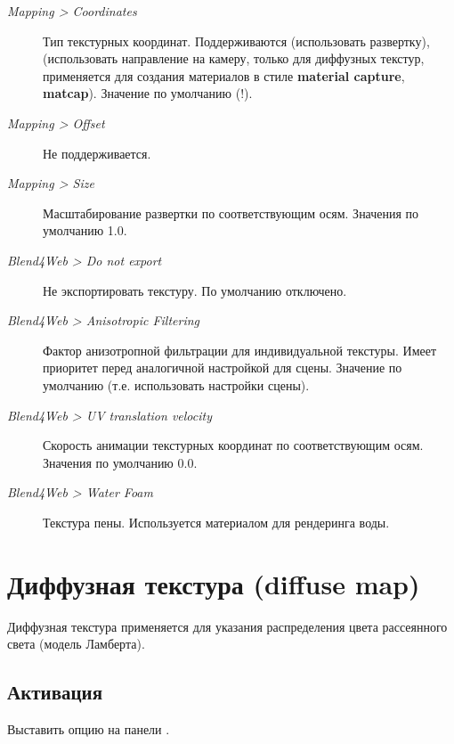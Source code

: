 \documentclass[a4paper,12pt,oneside]{sphinxmanual}
\begin{document}
\begin{description}
\item[{\emph{Mapping \textgreater{} Coordinates}}] \leavevmode
Тип текстурных координат. Поддерживаются  (использовать развертку),  (использовать направление на камеру, только для диффузных текстур, применяется для создания материалов в стиле \textbf{material capture}, \textbf{matcap}). Значение по умолчанию  (!).

\item[{\emph{Mapping \textgreater{} Offset}}] \leavevmode
Не поддерживается.

\item[{\emph{Mapping \textgreater{} Size}}] \leavevmode
Масштабирование развертки по соответствующим осям. Значения по умолчанию 1.0.

\item[{\emph{Blend4Web \textgreater{} Do not export}}] \leavevmode
Не экспортировать текстуру. По умолчанию отключено.

\item[{\emph{Blend4Web \textgreater{} Anisotropic Filtering}}] \leavevmode
Фактор анизотропной фильтрации для индивидуальной текстуры. Имеет приоритет перед аналогичной настройкой для сцены. Значение по умолчанию  (т.е. использовать настройки сцены).

\item[{\emph{Blend4Web \textgreater{} UV translation velocity}}] \leavevmode
Скорость анимации текстурных координат по соответствующим осям. Значения по умолчанию 0.0.

\item[{\emph{Blend4Web \textgreater{} Water Foam}}] \leavevmode
Текстура пены. Используется материалом для рендеринга воды.

\end{description}


\section{Диффузная текстура (diffuse map)}
\label{textures:index-4}\label{textures:diffuse-map}
Диффузная текстура применяется для указания распределения цвета рассеянного света (модель Ламберта).


\subsection{Активация}
\label{textures:id4}
Выставить опцию  на панели .
\end{document}
